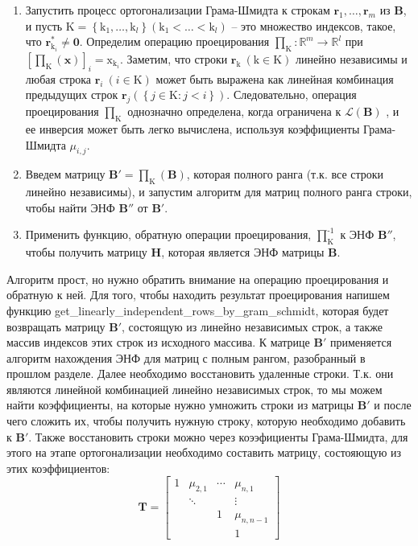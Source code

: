 \begin{enumerate}
\item Запустить процесс ортогонализации Грама-Шмидта к строкам $ \mathbf{r}_1, \ldots, \mathbf{r}_m $ из $ \mathbf{B} $, и пусть $ \mathrm{K}=\left\{\mathrm{k}_1, \ldots, \mathrm{k}_l \right\}(\mathrm{k}_1< \ldots <\mathrm{k}_l) $ – это множество индексов, такое, что $ \mathbf{r}_{\mathrm{k}_i}^\ast \neq \mathbf{0} $. Определим операцию проецирования $ \prod_\mathrm{K}:\mathbb{R}^m \rightarrow \mathbb{R}^l $ при $ [\prod_\mathrm{K}(\mathbf{x})]_i = \mathrm{x}_{\mathrm{k}_i} $. Заметим, что строки $ \mathbf{r}_\mathrm{k}\ (\mathrm{k} \in \mathrm{K}) $ линейно независимы и любая строка $ \mathbf{r}_i\ (i \in \mathrm{K}) $ может быть выражена как линейная комбинация предыдущих строк $ \mathbf{r}_j\left(\left\{j \in \mathrm{K}:j<i \right\}\right) $. Следовательно, операция проецирования $ \prod_\mathrm{K} $ однозначно определена, когда ограничена к $ \mathcal{L}(\mathbf{B})$ , и ее инверсия может быть легко вычислена, используя коэффициенты Грама-Шмидта $ \mu_{i,j} $.
\item Введем матрицу $ \mathbf{B}'=\prod_\mathrm{K}(\mathbf{B}) $, которая полного ранга (т.к. все строки линейно независимы), и запустим алгоритм для матриц полного ранга строки, чтобы найти ЭНФ $ \mathbf{B}'' $ от $ \mathbf{B}' $.
\item Применить функцию, обратную операции проецирования, $ \prod_\mathrm{K}^{\text{-}1} $ к ЭНФ $ \mathbf{B}'' $, чтобы получить матрицу $ \mathbf{H} $, которая является ЭНФ матрицы $ \mathbf{B} $.
\end{enumerate}

Алгоритм прост, но нужно обратить внимание на операцию проецирования и обратную к ней. Для того, чтобы находить результат проецирования напишем функцию get\_li\-ne\-ar\-ly\_in\-de\-pen\-dent\_rows\_by\_gram\_schmidt, которая будет возвращать матрицу $ \mathbf{B}' $, состоящую из линейно независимых строк, а также массив индексов этих строк из исходного массива. К матрице $ \mathbf{B}' $ применяется алгоритм нахождения ЭНФ для матриц с полным рангом, разобранный в прошлом разделе. Далее необходимо восстановить удаленные строки. Т.к. они являются линейной комбинацией линейно независимых строк, то мы можем найти коэффициенты, на которые нужно умножить строки из матрицы $ \mathbf{B}' $ и после чего сложить их, чтобы получить нужную строку, которую необходимо добавить к $ \mathbf{B}' $. Также восстановить строки можно через коээфициенты Грама-Шмидта, для этого на этапе ортогонализации необходимо составить матрицу, состояющую из этих коэффициентов: 
$$ \mathbf{T} = \left[\begin{array}{cccc}
1 & \mu_{2, 1} & \cdots & \mu_{n, 1} \\
 & \ddots &  & \vdots \\
 &  & 1 & \mu_{n, n-1} \\
 &  &  & 1
\end{array}\right] $$

